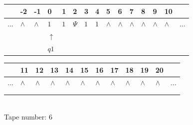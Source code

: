\documentclass[11pt]{article}
\begin{document}
\begin{table}[H]
\centering
\begin{tabular}{lllllllllllllll}
 & -2 & -1 & 0 & 1 & 2 & 3 & 4 & 5 & 6 & 7 & 8 & 9 & 10 & \\
\hline
$...$ & \multicolumn{1}{|l|}{$\wedge$} & \multicolumn{1}{|l|}{$\wedge$} & \multicolumn{1}{|l|}{$1$} & \multicolumn{1}{|l|}{$1$} & \multicolumn{1}{|l|}{$\Psi$} & \multicolumn{1}{|l|}{$1$} & \multicolumn{1}{|l|}{$1$} & \multicolumn{1}{|l|}{$\wedge$} & \multicolumn{1}{|l|}{$\wedge$} & \multicolumn{1}{|l|}{$\wedge$} & \multicolumn{1}{|l|}{$\wedge$} & \multicolumn{1}{|l|}{$\wedge$} & \multicolumn{1}{|l|}{$\wedge$} & $...$\\
\hline
&  &  & $\uparrow$ &  &  &  &  &  &  &  &  &  &  &  \\
&  &  & $ q1 $ &  &  &  &  &  &  &  &  &  &  &  \\
\end{tabular}
\begin{tabular}{llllllllllll}
 & 11 & 12 & 13 & 14 & 15 & 16 & 17 & 18 & 19 & 20 & \\
\hline
$...$ & \multicolumn{1}{|l|}{$\wedge$} & \multicolumn{1}{|l|}{$\wedge$} & \multicolumn{1}{|l|}{$\wedge$} & \multicolumn{1}{|l|}{$\wedge$} & \multicolumn{1}{|l|}{$\wedge$} & \multicolumn{1}{|l|}{$\wedge$} & \multicolumn{1}{|l|}{$\wedge$} & \multicolumn{1}{|l|}{$\wedge$} & \multicolumn{1}{|l|}{$\wedge$} & \multicolumn{1}{|l|}{$\wedge$} & $...$\\
\hline
&  &  &  &  &  &  &  &  &  &  &  \\
&  &  &  &  &  &  &  &  &  &  &  \\
\end{tabular}
\\
Tape number: 6
\noindent\makebox[\linewidth]{\hdashrule{\textwidth}{1pt}{1pt}}\end{table}
\end{document}
